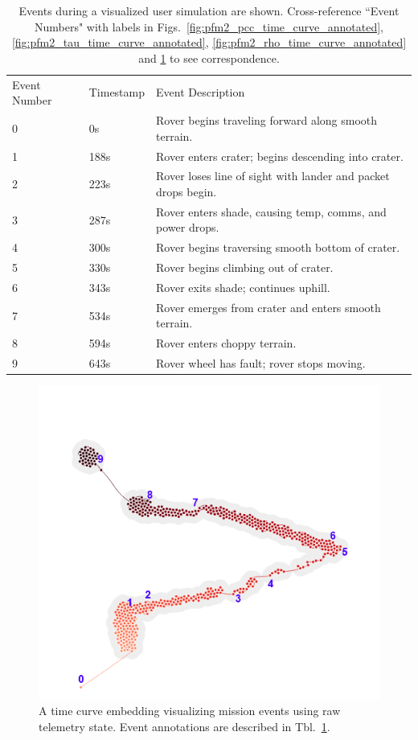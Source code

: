 \begin{table}[]
\centering
\begin{tabular}{lll}
Event Number & Timestamp & Event Description \\
0 & 0s & Rover begins traveling forward along smooth terrain. \\
1 & 188s & Rover enters crater; begins descending into crater. \\
2 & 223s & Rover loses line of sight with lander and packet drops begin. \\
3 & 287s & Rover enters shade, causing temp, comms, and power drops. \\
4 & 300s & Rover begins traversing smooth bottom of crater. \\
5 & 330s & Rover begins climbing out of crater. \\
6 & 343s & Rover exits shade; continues uphill. \\
7 & 534s & Rover emerges from crater and enters smooth terrain. \\
8 & 594s & Rover enters choppy terrain. \\
9 & 643s & Rover wheel has fault; rover stops moving.
\end{tabular}
\caption{Events during a visualized user simulation are shown. Cross-reference ``Event Numbers" with labels in Figs.~\ref{fig:pfm2_pcc_time_curve_annotated}, \ref{fig:pfm2_tau_time_curve_annotated}, \ref{fig:pfm2_rho_time_curve_annotated} and \ref{fig:pfm2_raw_data_time_curve_annotated} to see correspondence.}
\label{tbl:events}
\end{table}

\begin{figure}[h]
\centering
    \includegraphics{images/pfm2_raw_data_time_curve_annotated.png}
    \caption{A time curve embedding visualizing mission events using raw telemetry state. Event annotations are described in Tbl.~\ref{tbl:events}.}
    \label{fig:pfm2_raw_data_time_curve_annotated}
\end{figure}

